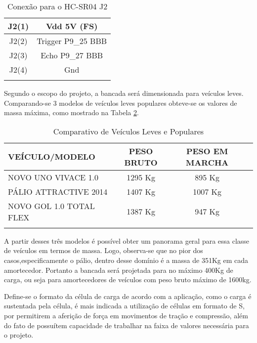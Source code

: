 	\begin{table}[!h]
	\centering
	\caption{Conexão para o HC-SR04 J2}
	\vspace{0.5cm}
	\begin{tabular}{c c}
	\hline
	J2(1)		&	Vdd 5V (FS)\\
	\hline
	J2(2)		&	Trigger P9\_25 BBB\\
	\hline
	J2(3)		&	Echo P9\_27 BBB\\
	\hline
	J2(4)		&	Gnd\\
	\hline
	\label{conexaovelocidade}
	\end{tabular}
	\end{table}


	Segundo o escopo do projeto, a bancada será dimensionada para veículos leves. Comparando-se 3 modelos de veículos leves populares obteve-se os valores de massa máxima, como mostrado na Tabela \ref{comparativocarros}.

	\begin{table}[!h]
	\centering
	\caption{Comparativo de Veículos Leves e Populares}
	\begin{tabular}{ l c c c}
	\hline
	\textbf{VEÍCULO/MODELO} & \textbf{PESO BRUTO} & \textbf{PESO EM MARCHA}\\
	\hline
	NOVO UNO VIVACE 1.0 & 1295 Kg & 895 Kg\\
	\hline
	PÁLIO ATTRACTIVE 2014 & 1407 Kg & 1007 Kg\\
	\hline
	NOVO GOL 1.0 TOTAL FLEX & 1387 Kg & 947 Kg\\
	\hline
	\label{comparativocarros}
	\end{tabular}
	\end{table}

		A partir desses três modelos é possível obter um panorama geral para essa classe de veículos em termos de massa. Logo, observa-se que no pior dos casos,especificamente o pálio, dentro desse domínio é a massa de 351Kg em cada amortecedor. Portanto a bancada será projetada para no máximo 400Kg de carga, ou seja para amortecedores de veículos com peso bruto máximo de 1600kg. 
		
		Define-se o formato da célula de carga de acordo com a aplicação, como o carga é sustentada pela célula, é mais indicada a utilização de células em formato de S, por permitirem a aferição de força em movimentos de tração e compressão, além do fato de possuítem capacidade de trabalhar na faixa de valores necessária para o projeto.
		
